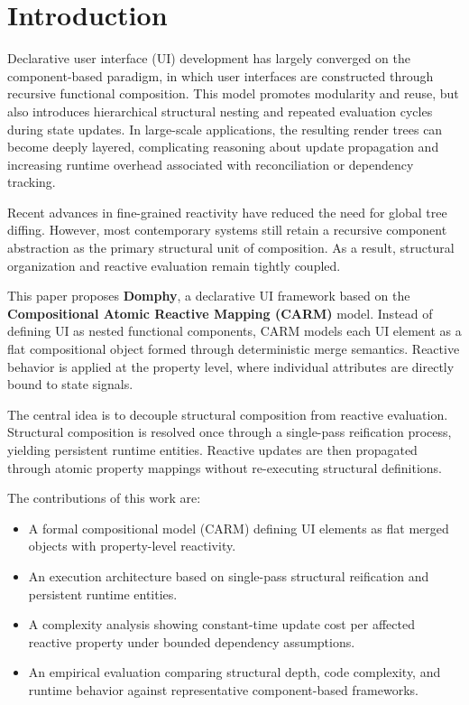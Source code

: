 \section{Introduction}

Declarative user interface (UI) development has largely converged on the component-based paradigm, in which user interfaces are constructed through recursive functional composition. This model promotes modularity and reuse, but also introduces hierarchical structural nesting and repeated evaluation cycles during state updates. In large-scale applications, the resulting render trees can become deeply layered, complicating reasoning about update propagation and increasing runtime overhead associated with reconciliation or dependency tracking.

Recent advances in fine-grained reactivity have reduced the need for global tree diffing. However, most contemporary systems still retain a recursive component abstraction as the primary structural unit of composition. As a result, structural organization and reactive evaluation remain tightly coupled.

This paper proposes \textbf{Domphy}, a declarative UI framework based on the \textbf{Compositional Atomic Reactive Mapping (CARM)} model. Instead of defining UI as nested functional components, CARM models each UI element as a flat compositional object formed through deterministic merge semantics. Reactive behavior is applied at the property level, where individual attributes are directly bound to state signals.

The central idea is to decouple structural composition from reactive evaluation. Structural composition is resolved once through a single-pass reification process, yielding persistent runtime entities. Reactive updates are then propagated through atomic property mappings without re-executing structural definitions.

The contributions of this work are:

\begin{itemize}
\item A formal compositional model (CARM) defining UI elements as flat merged objects with property-level reactivity.
\item An execution architecture based on single-pass structural reification and persistent runtime entities.
\item A complexity analysis showing constant-time update cost per affected reactive property under bounded dependency assumptions.
\item An empirical evaluation comparing structural depth, code complexity, and runtime behavior against representative component-based frameworks.
\end{itemize}
